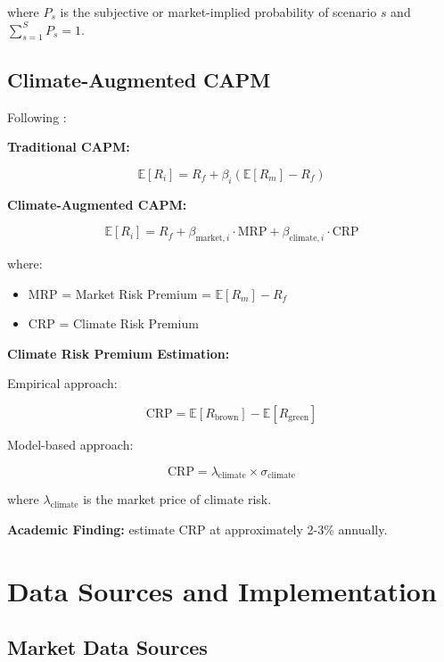 \documentclass[11pt,a4paper]{article}
\begin{document}
where $P_s$ is the subjective or market-implied probability of scenario $s$ and $\sum_{s=1}^{S} P_s = 1$.

\subsection{Climate-Augmented CAPM}

Following \citet{Dietz2018}:

\textbf{Traditional CAPM:}

\begin{equation}
\mathbb{E}[R_i] = R_f + \beta_i (\mathbb{E}[R_m] - R_f)
\end{equation}

\textbf{Climate-Augmented CAPM:}

\begin{equation}
\mathbb{E}[R_i] = R_f + \beta_{\text{market},i} \cdot \text{MRP} + \beta_{\text{climate},i} \cdot \text{CRP}
\end{equation}

where:
\begin{itemize}
    \item MRP = Market Risk Premium = $\mathbb{E}[R_m] - R_f$
    \item CRP = Climate Risk Premium
\end{itemize}

\textbf{Climate Risk Premium Estimation:}

Empirical approach:

\begin{equation}
\text{CRP} = \mathbb{E}[R_{\text{brown}}] - \mathbb{E}[R_{\text{green}}]
\end{equation}

Model-based approach:

\begin{equation}
\text{CRP} = \lambda_{\text{climate}} \times \sigma_{\text{climate}}
\end{equation}

where $\lambda_{\text{climate}}$ is the market price of climate risk.

\textbf{Academic Finding:} \citet{Huij2023} estimate CRP at approximately 2-3\% annually.

\section{Data Sources and Implementation}

\subsection{Market Data Sources}
\end{document}
